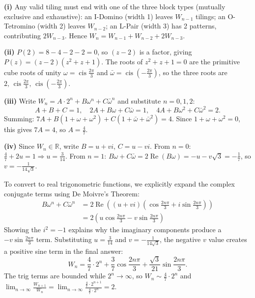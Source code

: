 \begin{solution}
\textbf{(i)} Any valid tiling must end with one of the three block types (mutually exclusive and exhaustive): an I-Domino (width 1) leaves $W_{n-1}$ tilings; an O-Tetromino (width 2) leaves $W_{n-2}$; an L-Pair (width 3) has 2 patterns, contributing $2W_{n-3}$. Hence $W_n = W_{n-1} + W_{n-2} + 2W_{n-3}$.

\smallskip\textbf{(ii)} $P(2) = 8-4-2-2=0$, so $(z-2)$ is a factor, giving $P(z)=(z-2)(z^2+z+1)$. The roots of $z^2+z+1=0$ are the primitive cube roots of unity $\omega=\operatorname{cis}\!\tfrac{2\pi}{3}$ and $\bar\omega=\operatorname{cis}\!\left(-\tfrac{2\pi}{3}\right)$, so the three roots are $2,\,\operatorname{cis}\!\tfrac{2\pi}{3},\,\operatorname{cis}\!\left(-\tfrac{2\pi}{3}\right)$.

\smallskip\textbf{(iii)} Write $W_n = A\cdot 2^n + B\omega^n + C\bar\omega^n$ and substitute $n=0,1,2$:
\[A+B+C=1,\quad 2A+B\omega+C\bar\omega=1,\quad 4A+B\omega^2+C\bar\omega^2=2.\]
Summing: $7A + B(1+\omega+\omega^2)+C(1+\bar\omega+\bar\omega^2)=4$. Since $1+\omega+\omega^2=0$, this gives $7A=4$, so $A=\tfrac{4}{7}$.

\smallskip\textbf{(iv)} Since $W_n\in\mathbb{R}$, write $B=u+vi$, $C=u-vi$. From $n=0$: $\tfrac{4}{7}+2u=1\Rightarrow u=\tfrac{3}{14}$. From $n=1$: $B\omega+C\bar\omega=2\operatorname{Re}(B\omega)=-u-v\sqrt{3}=-\tfrac{1}{7}$, so $v=-\tfrac{1}{14\sqrt{3}}$. 

To convert to real trigonometric functions, we explicitly expand the complex conjugate terms using De Moivre's Theorem:
\begin{align*}
B\omega^n + C\bar{\omega}^n &= 2\operatorname{Re}\left( (u+vi)\left(\cos \frac{2n\pi}{3} + i\sin \frac{2n\pi}{3}\right) \right) \\
&= 2\left(u\cos\frac{2n\pi}{3} - v\sin\frac{2n\pi}{3}\right)
\end{align*}
Showing the $i^2 = -1$ explains why the imaginary components produce a $-v\sin\frac{2n\pi}{3}$ term. Substituting $u = \frac{3}{14}$ and $v = -\frac{1}{14\sqrt{3}}$, the negative $v$ value creates a positive sine term in the final answer:
\[\boxed{W_n = \frac{4}{7}\cdot 2^n + \frac{3}{7}\cos\frac{2n\pi}{3} + \frac{\sqrt{3}}{21}\sin\frac{2n\pi}{3}.}\]
The trig terms are bounded while $2^n\to\infty$, so $W_n\sim\tfrac{4}{7}\cdot 2^n$ and
$\displaystyle\lim_{n\to\infty}\frac{W_{n+1}}{W_n}=\lim_{n\to\infty}\frac{\frac{4}{7}\cdot 2^{n+1}}{\frac{4}{7}\cdot 2^n}=2$.
\end{solution}

